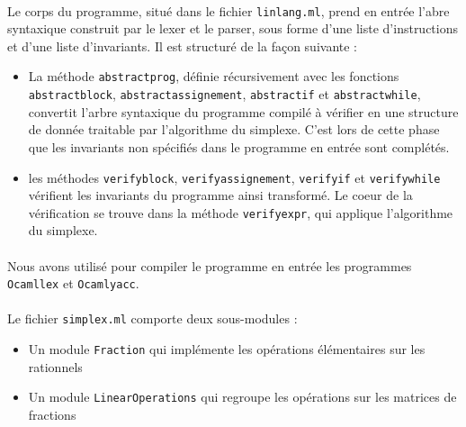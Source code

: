 \documentclass[a4paper]{article}
\begin{document}
\paragraph{}

Le corps du programme, situé dans le fichier \texttt{linlang.ml}, prend en entrée l'abre syntaxique construit par le lexer et le parser, sous forme d'une liste d'instructions et d'une liste d'invariants. Il est structuré de la façon suivante :

\begin{itemize}
  \item La méthode \texttt{abstract\textunderscore prog}, définie récursivement avec les fonctions \texttt{abstract\textunderscore block}, \texttt{abstract\textunderscore assignement}, \texttt{abstract\textunderscore if} et \texttt{abstract\textunderscore while}, convertit l'arbre syntaxique du programme compilé à vérifier en une structure de donnée traitable par l'algorithme du simplexe. C'est lors de cette phase que les invariants non spécifiés dans le programme en entrée sont complétés.
  \item les méthodes \texttt{verify\textunderscore block}, \texttt{verify\textunderscore assignement}, \texttt{verify\textunderscore if} et \texttt{verify\textunderscore while} vérifient les invariants du programme ainsi transformé. Le coeur de la vérification se trouve dans la méthode \texttt{verify\textunderscore expr}, qui applique l'algorithme du simplexe.
\end{itemize}

\paragraph{}

Nous avons utilisé pour compiler le programme en entrée les programmes \texttt{Ocamllex} et \texttt{Ocamlyacc}.

\paragraph{}

Le fichier \texttt{simplex.ml} comporte deux sous-modules :

\begin{itemize}
  \item Un module \texttt{Fraction} qui implémente les opérations élémentaires sur les rationnels
  \item Un module \texttt{LinearOperations} qui regroupe les opérations sur les matrices de fractions
\end{itemize}
\end{document}
